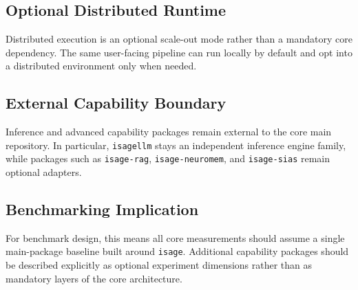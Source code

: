 \subsection{Optional Distributed Runtime}
\label{subsec:dd_distributed}

Distributed execution is an optional scale-out mode rather than a mandatory core dependency. The same user-facing pipeline can run locally by default and opt into a distributed environment only when needed.

\subsection{External Capability Boundary}
\label{subsec:dd_external}

Inference and advanced capability packages remain external to the core main repository. In particular, \texttt{isagellm} stays an independent inference engine family, while packages such as \texttt{isage-rag}, \texttt{isage-neuromem}, and \texttt{isage-sias} remain optional adapters.

\subsection{Benchmarking Implication}
\label{subsec:dd_benchmarking}

For benchmark design, this means all core measurements should assume a single main-package baseline built around \texttt{isage}. Additional capability packages should be described explicitly as optional experiment dimensions rather than as mandatory layers of the core architecture.
